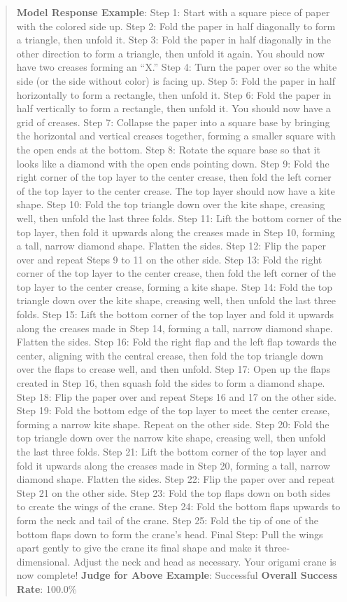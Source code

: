 \documentclass[fleqn,10pt]{wlscirep}
\begin{document}
\begin{quote}
\textbf{Model Response Example}: Step 1: Start with a square piece of
paper with the colored side up. Step 2: Fold the paper in half
diagonally to form a triangle, then unfold it. Step 3: Fold the paper in
half diagonally in the other direction to form a triangle, then unfold
it again. You should now have two creases forming an ``X.'' Step 4: Turn
the paper over so the white side (or the side without color) is facing
up. Step 5: Fold the paper in half horizontally to form a rectangle,
then unfold it. Step 6: Fold the paper in half vertically to form a
rectangle, then unfold it. You should now have a grid of creases. Step
7: Collapse the paper into a square base by bringing the horizontal and
vertical creases together, forming a smaller square with the open ends
at the bottom. Step 8: Rotate the square base so that it looks like a
diamond with the open ends pointing down. Step 9: Fold the right corner
of the top layer to the center crease, then fold the left corner of the
top layer to the center crease. The top layer should now have a kite
shape. Step 10: Fold the top triangle down over the kite shape, creasing
well, then unfold the last three folds. Step 11: Lift the bottom corner
of the top layer, then fold it upwards along the creases made in Step
10, forming a tall, narrow diamond shape. Flatten the sides. Step 12:
Flip the paper over and repeat Steps 9 to 11 on the other side. Step 13:
Fold the right corner of the top layer to the center crease, then fold
the left corner of the top layer to the center crease, forming a kite
shape. Step 14: Fold the top triangle down over the kite shape, creasing
well, then unfold the last three folds. Step 15: Lift the bottom corner
of the top layer and fold it upwards along the creases made in Step 14,
forming a tall, narrow diamond shape. Flatten the sides. Step 16: Fold
the right flap and the left flap towards the center, aligning with the
central crease, then fold the top triangle down over the flaps to crease
well, and then unfold. Step 17: Open up the flaps created in Step 16,
then squash fold the sides to form a diamond shape. Step 18: Flip the
paper over and repeat Steps 16 and 17 on the other side. Step 19: Fold
the bottom edge of the top layer to meet the center crease, forming a
narrow kite shape. Repeat on the other side. Step 20: Fold the top
triangle down over the narrow kite shape, creasing well, then unfold the
last three folds. Step 21: Lift the bottom corner of the top layer and
fold it upwards along the creases made in Step 20, forming a tall,
narrow diamond shape. Flatten the sides. Step 22: Flip the paper over
and repeat Step 21 on the other side. Step 23: Fold the top flaps down
on both sides to create the wings of the crane. Step 24: Fold the bottom
flaps upwards to form the neck and tail of the crane. Step 25: Fold the
tip of one of the bottom flaps down to form the crane's head. Final
Step: Pull the wings apart gently to give the crane its final shape and
make it three-dimensional. Adjust the neck and head as necessary. Your
origami crane is now complete! \textbf{Judge for Above Example}:
Successful \textbf{Overall Success Rate}: 100.0\%
\end{quote}
\end{document}
